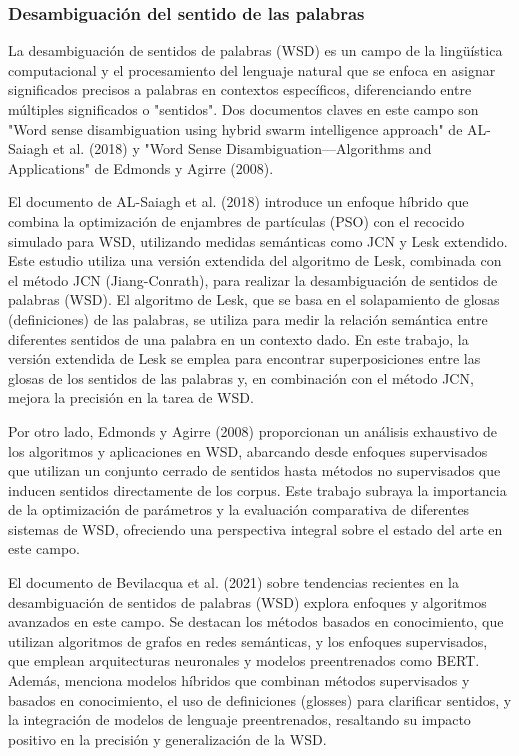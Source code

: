 \subsubsection{Desambiguaci\'on del sentido de las palabras}

La desambiguación de sentidos de palabras (WSD) es un campo de la lingüística computacional y el procesamiento del lenguaje natural que se enfoca en asignar significados precisos a palabras en contextos específicos, diferenciando entre múltiples significados o "sentidos". Dos documentos claves en este campo son "Word sense disambiguation using hybrid swarm intelligence approach" de AL-Saiagh et al. (2018) y "Word Sense Disambiguation—Algorithms and Applications" de Edmonds y Agirre (2008).

El documento de AL-Saiagh et al. (2018) introduce un enfoque híbrido que combina la optimización de enjambres de partículas (PSO) con el recocido simulado para WSD, utilizando medidas semánticas como JCN y Lesk extendido. 
Este estudio utiliza una versión extendida del algoritmo de Lesk, combinada con el método JCN (Jiang-Conrath), para realizar la desambiguación de sentidos de palabras (WSD). El algoritmo de Lesk, que se basa en el solapamiento de glosas (definiciones) de las palabras, se utiliza para medir la relación semántica entre diferentes sentidos de una palabra en un contexto dado. En este trabajo, la versión extendida de Lesk se emplea para encontrar superposiciones entre las glosas de los sentidos de las palabras y, en combinación con el método JCN, mejora la precisión en la tarea de WSD.

Por otro lado, Edmonds y Agirre (2008) proporcionan un análisis exhaustivo de los algoritmos y aplicaciones en WSD, abarcando desde enfoques supervisados que utilizan un conjunto cerrado de sentidos hasta métodos no supervisados que inducen sentidos directamente de los corpus. Este trabajo subraya la importancia de la optimización de parámetros y la evaluación comparativa de diferentes sistemas de WSD, ofreciendo una perspectiva integral sobre el estado del arte en este campo.

El documento de Bevilacqua et al. (2021) sobre tendencias recientes en la desambiguación de sentidos de palabras (WSD) explora enfoques y algoritmos avanzados en este campo. Se destacan los métodos basados en conocimiento, que utilizan algoritmos de grafos en redes semánticas, y los enfoques supervisados, que emplean arquitecturas neuronales y modelos preentrenados como BERT. Además, menciona modelos híbridos que combinan métodos supervisados y basados en conocimiento, el uso de definiciones (glosses) para clarificar sentidos, y la integración de modelos de lenguaje preentrenados, resaltando su impacto positivo en la precisión y generalización de la WSD.